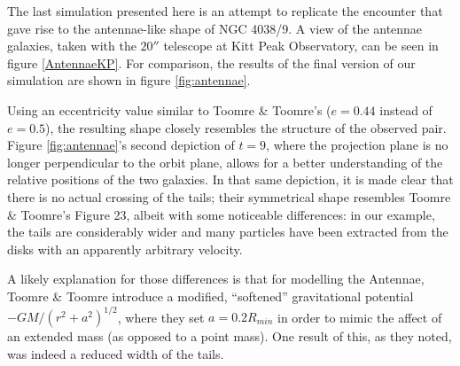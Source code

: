 \documentclass[11pt,twocolumn]{article}
\begin{document}
        The last simulation presented here is an attempt to replicate the encounter that gave rise to the antennae-like shape of NGC 4038/9. A view of the antennae galaxies, taken with the $20''$ telescope at Kitt Peak Observatory, can be seen in figure \ref{AntennaeKP}. For comparison, the results of the final version of our simulation are shown in figure \ref{fig:antennae}.
  
        Using an eccentricity value similar to Toomre \& Toomre's ($e = 0.44$ instead of $e=0.5$), the resulting shape closely resembles the structure of the observed pair. Figure \ref{fig:antennae}'s second depiction of $t=9$, where the projection plane is no longer perpendicular to the orbit plane, allows for a better understanding of the relative positions of the two galaxies. In that same depiction, it is made clear that there is no actual crossing of the tails; their symmetrical shape resembles Toomre \& Toomre's Figure 23, albeit with some noticeable differences: in our example, the tails are considerably wider and many particles have been extracted from the disks with an apparently arbitrary velocity. 
        
        A likely explanation for those differences is that for modelling the Antennae, Toomre \& Toomre introduce a modified, ``softened'' gravitational potential $-GM/(r^2 + a^2)^{1/2}$, where they set $a = 0.2R_{min}$ in order to mimic the affect of an extended mass (as opposed to a point mass). One result of this, as they noted, was indeed a reduced width of the tails.

  \label{EndProject}     
       
\end{document}
